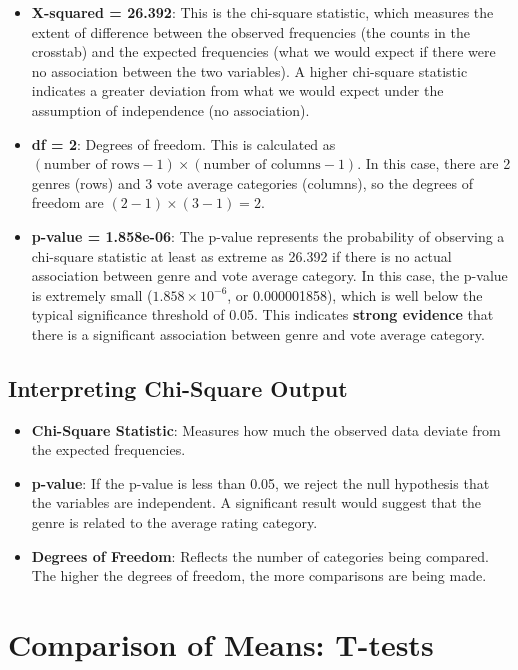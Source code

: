 \documentclass[
]{book}
\providecommand{\tightlist}{%
  \setlength{\itemsep}{0pt}\setlength{\parskip}{0pt}}
\begin{document}
\begin{itemize}
\item
  \textbf{X-squared = 26.392}: This is the chi-square statistic, which measures the extent of difference between the observed frequencies (the counts in the crosstab) and the expected frequencies (what we would expect if there were no association between the two variables). A higher chi-square statistic indicates a greater deviation from what we would expect under the assumption of independence (no association).
\item
  \textbf{df = 2}: Degrees of freedom. This is calculated as \((\text{number of rows} - 1) \times (\text{number of columns} - 1)\). In this case, there are 2 genres (rows) and 3 vote average categories (columns), so the degrees of freedom are \((2 - 1) \times (3 - 1) = 2\).
\item
  \textbf{p-value = 1.858e-06}: The p-value represents the probability of observing a chi-square statistic at least as extreme as 26.392 if there is no actual association between genre and vote average category. In this case, the p-value is extremely small (\(1.858 \times 10^{-6}\), or 0.000001858), which is well below the typical significance threshold of 0.05. This indicates \textbf{strong evidence} that there is a significant association between genre and vote average category.
\end{itemize}

\subsection*{Interpreting Chi-Square Output}\label{interpreting-chi-square-output}

\begin{itemize}
\tightlist
\item
  \textbf{Chi-Square Statistic}: Measures how much the observed data deviate from the expected frequencies.
\item
  \textbf{p-value}: If the p-value is less than 0.05, we reject the null hypothesis that the variables are independent. A significant result would suggest that the genre is related to the average rating category.
\item
  \textbf{Degrees of Freedom}: Reflects the number of categories being compared. The higher the degrees of freedom, the more comparisons are being made.
\end{itemize}

\section{Comparison of Means: T-tests}\label{comparison-of-means-t-tests}
\end{document}
